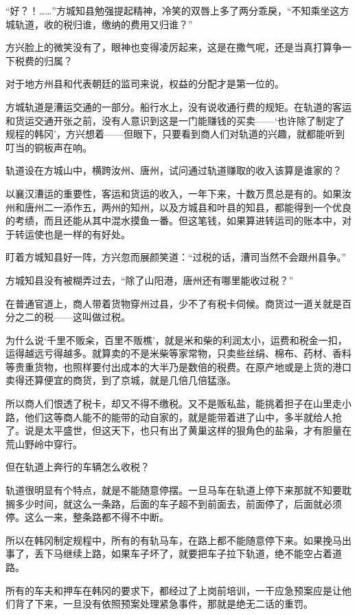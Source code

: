 “好？！……”方城知县勉强提起精神，冷笑的双唇上多了两分乖戾，“不知乘坐这方城轨道，收的税归谁，缴纳的费用又归谁？”

方兴脸上的微笑没有了，眼神也变得凌厉起来，这是在撒气呢，还是当真打算争一下税费的归属？

对于地方州县和代表朝廷的监司来说，权益的分配才是第一位的。

方城轨道是漕运交通的一部分。船行水上，没有说收通行费的规矩。在轨道的客运和货运交通开张之前，没有人意识到这是一门能赚钱的买卖——‘也许除了制定了规程的韩冈’，方兴想着——但眼下，只要看到商人们对轨道的兴趣，就都能听到叮当的铜板声在响。

轨道设在方城山中，横跨汝州、唐州，试问通过轨道赚取的收入该算是谁家的？

以襄汉漕运的重要性，客运和货运的收入，一年下来，十数万贯总是有的。如果汝州和唐州二一添作五，两州的知州，以及方城县和叶县的知县，都能得到一个优良的考绩，而且还能从其中混水摸鱼一番。但这笔钱，如果算进转运司的账本中，对于转运使也是一样的有好处。

盯着方城知县好一阵，方兴忽而展颜笑道：“过税的话，漕司当然不会跟州县争。”

方城知县没有被糊弄过去，“除了山阳港，唐州还有哪里能收过税？”

在普通官道上，商人带着货物穿州过县，少不了有税卡伺候。商货过一道关就是百分之二的税——这叫做过税。

为什么说‘千里不贩籴，百里不贩樵’，就是米和柴的利润太小，运费和税金一扣，运得越远亏得越多。就算卖的不是米柴等家常物，只卖些丝绢、棉布、药材、香料等贵重货物，也照样要付出成本的大半乃是数倍的税费。在原产地或是上货的港口卖得还算便宜的商货，到了京城，就是几倍几倍猛涨。

所以商人们恨透了税卡，却又不得不缴税。又不是贩私盐，能挑着担子在山里走小路，他们这等商人能不的能带的动自家的，就是能带着进了山中，多半就给人抢了。说是太平盛世，但这天下，也只有出了黄巢这样的狠角色的盐枭，才有胆量在荒山野岭中穿行。

但在轨道上奔行的车辆怎么收税？

轨道很明显有个特点，就是不能随意停摆。一旦马车在轨道上停下来那就不知要耽搁多少时间，就这么一条路，后面的车子超不到前面去，前面停了，后面就必须停。这么一来，整条路都不得不中断。

所以在韩冈制定规程中，所有的有轨马车，在路上都不能随意停下来。如果挽马出事了，丢下马继续上路，如果车子坏了，就要把车子拉下轨道，绝不能空占着道路。

所有的车夫和押车在韩冈的要求下，都经过了上岗前培训，一干应急预案应是让他们背了下来，一旦没有依照预案处理紧急事件，那就是绝无二话的重罚。


